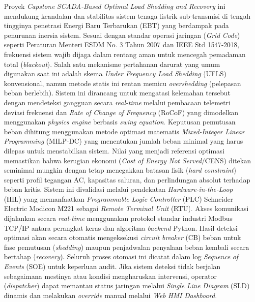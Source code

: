 Proyek \textit{Capstone SCADA-Based Optimal Load Shedding and Recovery} ini mendukung keandalan dan stabilitas sistem tenaga listrik sub-transmisi di tengah tingginya penetrasi Energi Baru Terbarukan (EBT) yang berdampak pada penurunan inersia sistem. Sesuai dengan standar operasi jaringan (\textit{Grid Code}) seperti Peraturan Menteri ESDM No. 3 Tahun 2007 dan IEEE Std 1547-2018, frekuensi sistem wajib dijaga dalam rentang aman untuk mencegah pemadaman total (\textit{blackout}). Salah satu mekanisme pertahanan darurat yang umum digunakan saat ini adalah skema \textit{Under Frequency Load Shedding} (UFLS) konvensional, namun metode statis ini rentan memicu \textit{overshedding} (pelepasan beban berlebih). Sistem ini dirancang untuk mengatasi kelemahan tersebut dengan mendeteksi gangguan secara \textit{real-time} melalui pembacaan telemetri deviasi frekuensi dan \textit{Rate of Change of Frequency} (RoCoF) yang dimodelkan menggunakan \textit{physics engine} berbasis \textit{swing equation}. Keputusan pemutusan beban dihitung menggunakan metode optimasi matematis \textit{Mixed-Integer Linear Programming} (MILP-DC) yang menentukan jumlah beban minimal yang harus dilepas untuk menstabilkan sistem. Nilai yang menjadi referensi optimasi memastikan bahwa kerugian ekonomi (\textit{Cost of Energy Not Served}/CENS) ditekan seminimal mungkin dengan tetap menegakkan batasan fisik (\textit{hard constraint}) seperti profil tegangan AC, kapasitas saluran, dan perlindungan absolut terhadap beban kritis. Sistem ini divalidasi melalui pendekatan \textit{Hardware-in-the-Loop} (HIL) yang memanfaatkan \textit{Programmable Logic Controller} (PLC) Schneider Electric Modicon M221 sebagai \textit{Remote Terminal Unit} (RTU). Akses komunikasi dijalankan secara \textit{real-time} menggunakan protokol standar industri Modbus TCP/IP antara perangkat keras dan algoritma \textit{backend} Python. Hasil deteksi optimasi akan secara otomatis mengeksekusi \textit{circuit breaker} (CB) beban untuk fase pemutusan (\textit{shedding}) maupun penjadwalan penyalaan beban kembali secara bertahap (\textit{recovery}). Seluruh proses otomasi ini dicatat dalam log \textit{Sequence of Events} (SOE) untuk keperluan audit. Jika sistem deteksi tidak berjalan sebagaimana mestinya atau kondisi mengharuskan intervensi, operator (\textit{dispatcher}) dapat memantau status jaringan melalui \textit{Single Line Diagram} (SLD) dinamis dan melakukan \textit{override} manual melalui \textit{Web HMI Dashboard}.